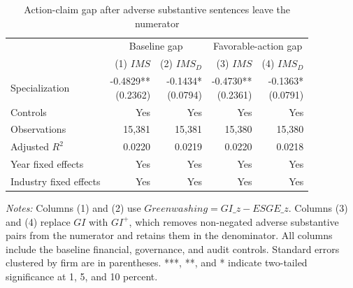 \begin{table}[H]
    \centering
    \caption{Action-claim gap after adverse substantive sentences leave the numerator}
    \label{tab:gi_plus}
    \begin{tabular}{lrrrr}
        \toprule
        & \multicolumn{2}{c}{Baseline gap} & \multicolumn{2}{c}{Favorable-action gap} \\
        \cmidrule(lr){2-3} \cmidrule(lr){4-5}
        & (1) \(IMS\) & (2) \(IMS_D\) & (3) \(IMS\) & (4) \(IMS_D\) \\
        \midrule
        Specialization & \shortstack{-0.4829** \\ (0.2362)} & \shortstack{-0.1434* \\ (0.0794)} & \shortstack{-0.4730** \\ (0.2361)} & \shortstack{-0.1363* \\ (0.0791)} \\
        Controls & Yes & Yes & Yes & Yes \\
        Observations & 15,381 & 15,381 & 15,380 & 15,380 \\
        Adjusted $R^2$ & 0.0220 & 0.0219 & 0.0220 & 0.0218 \\
        Year fixed effects & Yes & Yes & Yes & Yes \\
        Industry fixed effects & Yes & Yes & Yes & Yes \\
        \bottomrule
    \end{tabular}
    \par\smallskip
    \begin{minipage}{0.95\textwidth}
        \footnotesize
        \textit{Notes:} Columns (1) and (2) use \(Greenwashing=GI\_z-ESGE\_z\). Columns (3) and (4) replace \(GI\) with \(GI^+\), which removes non-negated adverse substantive pairs from the numerator and retains them in the denominator. All columns include the baseline financial, governance, and audit controls. Standard errors clustered by firm are in parentheses. ***, **, and * indicate two-tailed significance at 1, 5, and 10 percent.
    \end{minipage}
\end{table}
